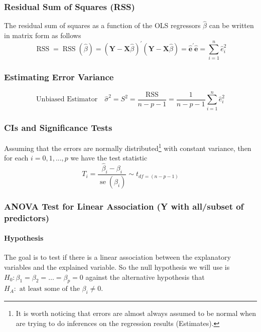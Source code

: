 \documentclass[11pt]{article}
\begin{document}
\subsubsection{Residual Sum of Squares (RSS)}
The residual sum of squares as a function of the OLS regressors $\hat{\beta}$ can be written in matrix form as follows
\begin{equation*}
    \operatorname{RSS}=\operatorname{RSS}(\hat{\beta})=(\mathbf{Y}-\mathbf{X} \hat{\beta})^{\prime}(\mathbf{Y}-\mathbf{X} \hat{\beta})=\hat{\mathbf{e}}^{\prime } \hat{\mathbf{e}}=\sum_{i=1}^{n} \hat{e}_{i}^{2}
\end{equation*}

\subsubsection{Estimating Error Variance}
\begin{equation*}
    \text{Unbiased Estimator}\quad \hat{\sigma}^2 = S^2 = \frac{\mathrm{RSS}}{n-p-1}=\frac{1}{n-p-1} \sum_{i=1}^{n} \hat{e}_{i}^{2}
\end{equation*}

\subsubsection{CIs and Significance Tests}
Assuming that the errors are normally distributed\footnote{It is worth noticing that errors are almost always assumed to be normal when are trying to do inferences on the regression results (Estimates).} with constant variance, then for each $i = 0,1,...,p$ we have the test statistic
\begin{equation*}
    T_{i}=\frac{\hat{\beta}_{i}-\beta_{i}}{\operatorname{se}(\hat{\beta_i})} \sim t_{df = (n-p-1)}
\end{equation*}

\subsubsection{ANOVA Test for Linear Association (Y with all/subset of predictors)}
\paragraph{Hypothesis} The goal is to test if there is a linear association between the explanatory variables and the explained variable. So the null hypothesis we will use is $H_{0}: \beta_{1}=\beta_{2}=\ldots=\beta_{p}=0$ against the alternative hypothesis that $H_{A}: \text { at least some of the } \beta_{i} \neq 0$. 
\end{document}
